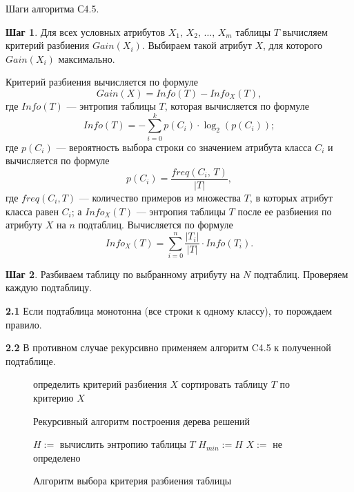 Шаги алгоритма С4.5.

\textbf{Шаг 1}. Для всех условных атрибутов $X_1,\,X_2,\,\ldots,\,X_m$ таблицы $T$ вычисляем критерий разбиения $Gain(X_i)$. Выбираем такой атрибут $X$, для которого $Gain(X_i)$ максимально.

Критерий разбиения вычисляется по формуле
$$
Gain(X) = Info(T) - Info_X(T),
$$
где $Info(T)$ --- энтропия таблицы $T$, которая вычисляется по формуле
$$
Info(T) = -\sum_{i=0}^{k} p(C_i) \cdot \log_2(p(C_i));
$$
где $p(C_i)$ --- вероятность выбора строки со значением атрибута класса $C_i$ и вычисляется по формуле
$$
p(C_i) = \frac{freq(C_i,\,T)}{|T|},
$$
где $freq(C_i,T)$ --- количество примеров из множества $T$, в которых атрибут класса равен $C_i$;
а $Info_X(T)$ --- энтропия таблицы $T$ после ее разбиения по атрибуту $X$ на $n$ подтаблиц. Вычисляется по формуле
$$
Info_X(T) = \sum_{i=0}^{n} \frac{|T_i|}{|T|} \cdot Info(T_i).
$$

\textbf{Шаг 2}. Разбиваем таблицу по выбранному атрибуту на $N$ подтаблиц. Проверяем каждую подтаблицу.

\textbf{2.1} Если подтаблица монотонна (все строки к одному классу), то порождаем правило.

\textbf{2.2} В противном случае рекурсивно применяем алгоритм C4.5 к полученной подтаблице.

\begin{figure}[H]
	\centering
	\begin{algorithm}[H]
		\SetAlgoLined
		\DontPrintSemicolon
		определить критерий разбиения $X$\;
		сортировать таблицу $T$ по критерию $X$\;
	\end{algorithm}
	\caption{Рекурсивный алгоритм построения дерева решений}\label{fig:alg-c4.5}
\end{figure}

\begin{figure}[H]
	\centering
	\begin{algorithm}[H]
		\SetAlgoLined
		\DontPrintSemicolon
		$H := $ вычислить энтропию таблицы $T$\;
		$H_{min} := H$\;
		$X := $ не определено\;
	\end{algorithm}
	\caption{Алгоритм выбора критерия разбиения таблицы}\label{fig:alg-crit}
\end{figure}

